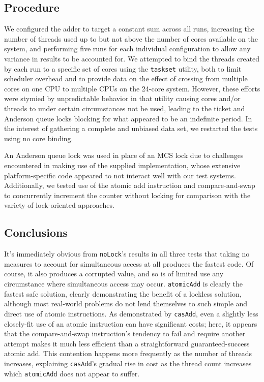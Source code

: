 \documentclass[letterpaper]{article}
\begin{document}
\pagestyle{fancy}
\subsection*{Procedure}
We configured the adder to target a constant sum across all runs, increasing the number of threads used up to but not above the number of cores available on the system, and performing five runs for each individual configuration to allow any variance in results to be accounted for.
We attempted to bind the threads created by each run to a specific set of cores using the \texttt{taskset} utility, both to limit scheduler overhead and to provide data on the effect of crossing from multiple cores on one CPU to multiple CPUs on the 24-core system.
However, these efforts were stymied by unpredictable behavior in that utility causing cores and/or threads to under certain circumstances not be used, leading to the ticket and Anderson queue locks blocking for what appeared to be an indefinite period.
In the interest of gathering a complete and unbiased data set, we restarted the tests using no core binding.

An Anderson queue lock was used in place of an MCS lock due to challenges encountered in making use of the supplied implementation, whose extensive platform-specific code appeared to not interact well with our test systems.
Additionally, we tested use of the atomic add instruction and compare-and-swap to concurrently increment the counter without locking for comparison with the variety of lock-oriented approaches.

\subsection*{Conclusions}
It's immediately obvious from \texttt{noLock}'s results in all three tests that taking no measures to account for simultaneous access at all produces the fastest code.
Of course, it also produces a corrupted value, and so is of limited use any circumstance where simultaneous access may occur.
\texttt{atomicAdd} is clearly the fastest safe solution, clearly demonstrating the benefit of a lockless solution, although most real-world problems do not lend themselves to such simple and direct use of atomic instructions.
As demonstrated by \texttt{casAdd}, even a slightly less closely-fit use of an atomic instruction can have significant costs; here, it appears that the compare-and-swap instruction's tendency to fail and require another attempt makes it much less efficient than a straightforward guaranteed-success atomic add.
This contention happens more frequently as the number of threads increases, explaining \texttt{casAdd}'s gradual rise in cost as the thread count increases which \texttt{atomicAdd} does not appear to suffer.
\end{document}
